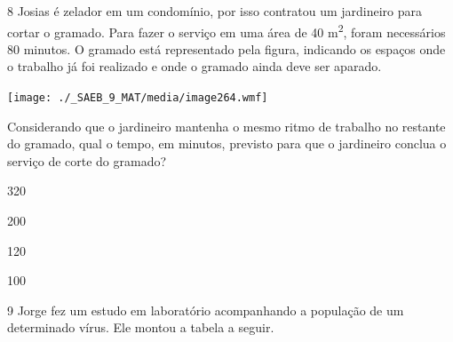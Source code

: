{{{\begin{escolha}
{{{{{\begin{escolha}
\begin{escolha}
{\begin{q°}
{\begin{escolha}
\begin{escolha}
\begin{escolha}
\begin{escolha}
\begin{escolha}
\begin{escolha}
\num{8} Josias é zelador em um condomínio, por isso contratou um jardineiro
para cortar o gramado. Para fazer o serviço em uma área de 
40 m\textsuperscript{2}, foram necessários 80 minutos. O gramado está
representado pela figura, indicando os espaços onde o trabalho já foi
realizado e onde o gramado ainda deve ser aparado.

\texttt{[image: ./\_SAEB\_9\_MAT/media/image264.wmf]}

Considerando que o jardineiro mantenha o mesmo ritmo de trabalho no
restante do gramado, qual o tempo, em minutos, previsto para que o
jardineiro conclua o serviço de corte do gramado?

\begin{escolha}

  \item 320

  \item 200

  \item 120

  \item 100

\end{escolha}


\num{9} Jorge fez um estudo em laboratório acompanhando a população de um
determinado vírus. Ele montou a tabela a seguir.


\end{escolha}
\end{escolha}
\end{escolha}
\end{escolha}
\end{escolha}
\end{escolha}}
\end{q°}}
\end{escolha}
\end{escolha}}}}}}
\end{escolha}}}}
